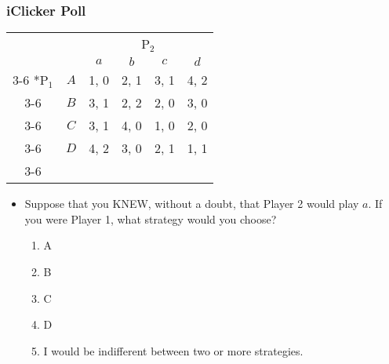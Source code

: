 \begin{frame}
\frametitle{iClicker Poll}
\begin{table}[h]
\centering
\begin{tabular}{cc|c|c|c|c|}
	& \multicolumn{1}{c}{} & \multicolumn{4}{c}{P$_2$}\\
	& \multicolumn{1}{c}{} & \multicolumn{1}{c}{$a$} & \multicolumn{1}{c}{$b$} & \multicolumn{1}{c}{$c$} & \multicolumn{1}{c}{$d$} \\\cline{3-6}
	\multirow{4}*{P$_1$}  & $A$ & 1, 0 & 2, 1 & 3, 1 & 4, 2 \\\cline{3-6}
	& $B$ & 3, 1 & 2, 2 & 2, 0 & 3, 0 \\\cline{3-6}
	& $C$ & 3, 1 & 4, 0 & 1, 0 & 2, 0 \\\cline{3-6}
	& $D$ & 4, 2 & 3, 0 & 2, 1 & 1, 1 \\\cline{3-6}
\end{tabular}
\end{table}
\begin{itemize}
\item Suppose that you KNEW, without a doubt, that Player 2 would play $a$. If you were Player 1, what strategy would you choose?
\begin{enumerate}
	\item A
	\item B
	\item C
	\item D
	\item I would be indifferent between two or more strategies.
\end{enumerate}
\end{itemize}
\end{frame}

